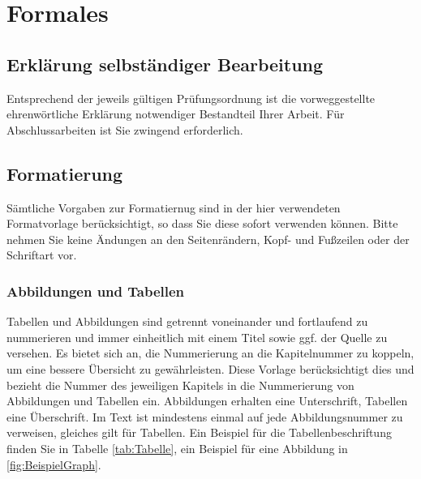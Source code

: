\chapter{Formales}
\label{chap:Formales}

\section{Erklärung selbständiger Bearbeitung}
Entsprechend der jeweils gültigen Prüfungsordnung ist die vorweggestellte ehrenwörtliche Erklärung notwendiger Bestandteil Ihrer Arbeit. Für Abschlussarbeiten ist Sie zwingend erforderlich.
\section{Formatierung}

Sämtliche Vorgaben zur Formatiernug sind in der hier verwendeten Formatvorlage berücksichtigt, so dass Sie diese sofort verwenden können. Bitte nehmen Sie keine Ändungen an den Seitenrändern, Kopf- und Fußzeilen oder der Schriftart vor.

\subsection{Abbildungen und Tabellen}
Tabellen und Abbildungen sind getrennt voneinander und fortlaufend zu nummerieren und immer einheitlich mit einem Titel sowie ggf. der Quelle zu versehen. Es bietet sich an, die Nummerierung an die Kapitelnummer zu koppeln, um eine bessere Übersicht zu gewährleisten. Diese Vorlage berücksichtigt dies und bezieht die Nummer des jeweiligen Kapitels in die Nummerierung von Abbildungen und Tabellen ein. Abbildungen erhalten eine Unterschrift, Tabellen eine Überschrift. Im Text ist mindestens einmal auf jede Abbildungsnummer zu verweisen, gleiches gilt für Tabellen. 
Ein Beispiel für die Tabellenbeschriftung finden Sie in Tabelle \ref{tab:Tabelle}, ein Beispiel für eine Abbildung in \ref{fig:BeispielGraph}.

